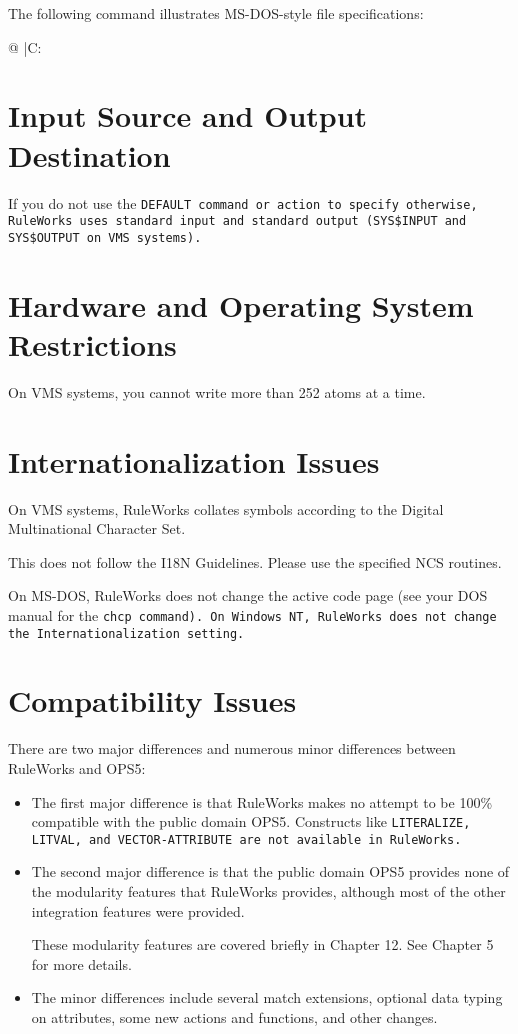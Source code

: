 The following command illustrates MS-DOS-style file specifications:
\begin{qv}
@ |C:\smith\work\init%
\end{qv}

\section{Input Source and Output Destination}

If you do not use the \tt{DEFAULT} command or action to specify
otherwise, RuleWorks uses standard input and standard output
(\verb|SYS$INPUT| and \verb|SYS$OUTPUT| on VMS systems).

\section{Hardware and Operating System Restrictions}

On VMS systems, you cannot write more than 252 atoms at a time.

\section{Internationalization Issues}

On VMS systems, RuleWorks collates symbols according to the Digital
Multinational Character Set.

This does not follow the I18N Guidelines. Please use the specified NCS
routines.

On MS-DOS, RuleWorks does not change the active code page (see your
DOS manual for the \tt{chcp} command). On Windows NT, RuleWorks does not
change the Internationalization setting.

\section{Compatibility Issues}

There are two major differences and numerous minor differences between
RuleWorks and OPS5:
\begin{itemize}
\item The first major difference is that RuleWorks makes no attempt to
  be 100\% compatible with the public domain OPS5. Constructs like
  \tt{LITERALIZE}, \tt{LITVAL}, and \tt{VECTOR-ATTRIBUTE} are not
  available in RuleWorks.

\item The second major difference is that the public domain OPS5
  provides none of the modularity features that RuleWorks provides,
  although most of the other integration features were provided.

  These modularity features are covered briefly in Chapter 12. See
  Chapter 5 for more details.

\item The minor differences include several match extensions, optional
  data typing on attributes, some new actions and functions, and other
  changes.
\end{itemize}

